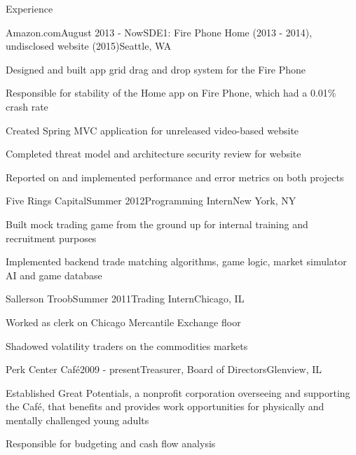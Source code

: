 \documentclass{resume} %
\begin{document}
\begin{rSection}{Experience}

\begin{rSubsection}{Amazon.com}{August 2013 - Now}{SDE1: Fire Phone Home (2013 - 2014), undisclosed website (2015)}{Seattle, WA}
\item Designed and built app grid drag and drop system for the Fire Phone
\item Responsible for stability of the Home app on Fire Phone, which had a 0.01\% crash rate
\item Created Spring MVC application for unreleased video-based website
\item Completed threat model and architecture security review for website
\item Reported on and implemented performance and error metrics on both projects
\end{rSubsection}

\begin{rSubsection}{Five Rings Capital}{Summer 2012}{Programming Intern}{New York, NY}
\item Built mock trading game from the ground up for internal training and recruitment purposes
\item Implemented backend trade matching algorithms, game logic, market simulator AI and game database
\end{rSubsection}


\begin{rSubsection}{Sallerson Troob}{Summer 2011}{Trading Intern}{Chicago, IL}
\item Worked as clerk on Chicago Mercantile Exchange floor
\item Shadowed volatility traders on the commodities markets
\end{rSubsection}


\begin{rSubsection}{Perk Center Caf\'{e}}{2009 - present}{Treasurer, Board of Directors}{Glenview, IL}
\item Established Great Potentials, a nonprofit corporation overseeing and supporting the Caf\'{e}, that benefits and provides work opportunities for physically and mentally challenged young adults
\item Responsible for budgeting and cash flow analysis
\end{rSubsection}

\end{rSection}
\end{document}

